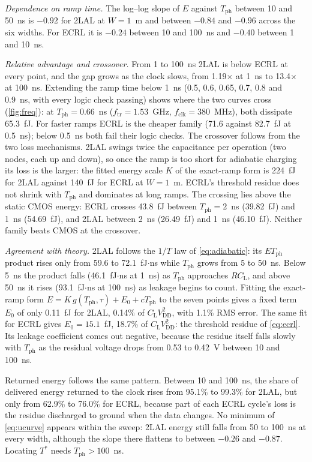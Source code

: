 \documentclass[conference]{IEEEtran}
\newcommand{\VDD}{V_{\mathrm{DD}}}
\newcommand{\CL}{C_{\mathrm{L}}}
\newcommand{\Tph}{T_{\mathrm{ph}}}
\begin{document}
\emph{Dependence on ramp time.} The log--log slope of $E$ against $\Tph$
between 10 and 50~ns is $-0.92$ for 2LAL at $W=1$~\textmu m and between
$-0.84$ and $-0.96$ across the six widths. For ECRL it is $-0.24$ between 10
and 100~ns and $-0.40$ between 1 and 10~ns.

\emph{Relative advantage and crossover.} From 1 to 100~ns 2LAL is below
ECRL at every point, and the gap grows as the clock slows, from
1.19$\times$ at 1~ns to 13.4$\times$ at 100~ns. Extending the ramp time below
1~ns (0.5, 0.6, 0.65, 0.7, 0.8 and 0.9~ns, with every logic check passing)
shows where the two curves cross (\cref{fig:freq}): at $\Tph=0.66$~ns
($f_{\mathrm{tr}}=1.53$~GHz, $f_{\mathrm{clk}}=380$~MHz), both dissipate
65.3~fJ. For faster ramps ECRL is the cheaper family (71.6 against 82.7~fJ at
0.5~ns); below 0.5~ns both fail their logic checks. The crossover follows
from the two loss mechanisms. 2LAL swings twice the capacitance per operation
(two nodes, each up and down), so once the ramp is too short for adiabatic
charging its loss is the larger: the fitted energy scale $K$ of the exact-ramp
form is 224~fJ for 2LAL against 140~fJ for ECRL at $W=1$~\textmu m. ECRL's
threshold residue does not shrink with $\Tph$ and dominates at long ramps.
The crossing lies above the static CMOS energy: ECRL crosses 43.8~fJ between
$\Tph=2$~ns (39.82~fJ) and 1~ns (54.69~fJ), and 2LAL between 2~ns
(26.49~fJ) and 1~ns (46.10~fJ). Neither family beats CMOS at the crossover.

\emph{Agreement with theory.} 2LAL follows the $1/T$ law of
\cref{eq:adiabatic}: its $E\Tph$ product rises only from 59.6 to
72.1~fJ$\cdot$ns while $\Tph$ grows from 5 to 50~ns. Below 5~ns the product
falls (46.1~fJ$\cdot$ns at 1~ns) as $\Tph$ approaches $R\CL$, and above 50~ns
it rises (93.1~fJ$\cdot$ns at 100~ns) as leakage begins to count. Fitting
the exact-ramp form $E=K\,g(\Tph,\tau)+E_0+c\Tph$ to the seven points gives a
fixed term $E_0$ of only 0.11~fJ for 2LAL, 0.14\% of $\CL\VDD^2$, with
1.1\% RMS error. The same fit for ECRL gives $E_0=15.1$~fJ, 18.7\% of
$\CL\VDD^2$: the threshold residue of \cref{eq:ecrl}. Its leakage coefficient
comes out negative, because the residue itself falls slowly with $\Tph$ as
the residual voltage drops from 0.53 to 0.42~V between 10 and 100~ns.

Returned energy follows the same pattern. Between 10 and 100~ns, the share of
delivered energy returned to the clock rises from 95.1\% to 99.3\% for 2LAL,
but only from 62.9\% to 76.0\% for ECRL, because part of each ECRL cycle's
loss is the residue discharged to ground when the data changes. No minimum
of \cref{eq:ucurve} appears within the sweep: 2LAL energy still falls from
50 to 100~ns at every width, although the slope there flattens to between
$-0.26$ and $-0.87$. Locating $T^{*}$ needs $\Tph>100$~ns.
\end{document}

